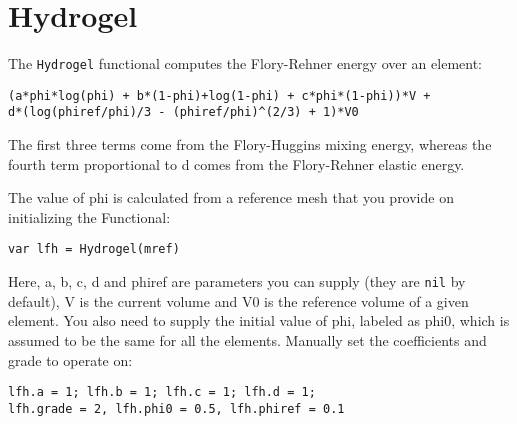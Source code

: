 \hypertarget{hydrogel}{%
\section{Hydrogel}\label{hydrogel}}

The \texttt{Hydrogel} functional computes the Flory-Rehner energy over
an element:

\begin{lstlisting}
(a*phi*log(phi) + b*(1-phi)+log(1-phi) + c*phi*(1-phi))*V + 
d*(log(phiref/phi)/3 - (phiref/phi)^(2/3) + 1)*V0
\end{lstlisting}

The first three terms come from the Flory-Huggins mixing energy, whereas
the fourth term proportional to d comes from the Flory-Rehner elastic
energy.

The value of phi is calculated from a reference mesh that you provide on
initializing the Functional:

\begin{lstlisting}
var lfh = Hydrogel(mref)
\end{lstlisting}

Here, a, b, c, d and phiref are parameters you can supply (they are
\texttt{nil} by default), V is the current volume and V0 is the
reference volume of a given element. You also need to supply the initial
value of phi, labeled as phi0, which is assumed to be the same for all
the elements. Manually set the coefficients and grade to operate on:

\begin{lstlisting}
lfh.a = 1; lfh.b = 1; lfh.c = 1; lfh.d = 1;
lfh.grade = 2, lfh.phi0 = 0.5, lfh.phiref = 0.1
\end{lstlisting}
